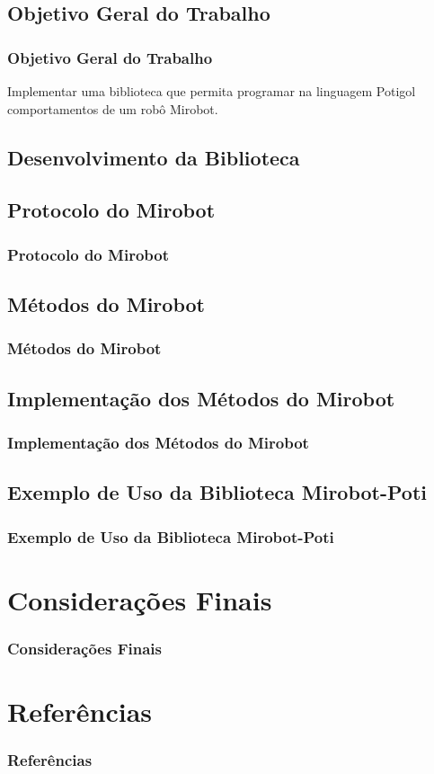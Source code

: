 \documentclass{beamer}
\begin{document}
\begin{frame}
  \section{Objetivo Geral do Trabalho}
  \frametitle{Objetivo Geral do Trabalho}
  \begin{center}
    Implementar uma biblioteca que permita programar na linguagem Potigol comportamentos de um robô Mirobot.
  \end{center}
\end{frame}
\begin{frame}
  \section{Desenvolvimento da Biblioteca}
  \subsection{Protocolo do Mirobot}
  \label{protocolo}
  \frametitle{Protocolo do Mirobot}
\end{frame}

\begin{frame}
  \subsection{Métodos do Mirobot}
  \label{metodos}
  \frametitle{Métodos do Mirobot}
\end{frame}

\begin{frame}
  \subsection{Implementação dos Métodos do Mirobot}
  \label{implementacao}
  \frametitle{Implementação dos Métodos do Mirobot}
\end{frame}

\begin{frame}
  \subsection{Exemplo de Uso da Biblioteca Mirobot-Poti}
  \label{exemplo}
  \frametitle{Exemplo de Uso da Biblioteca Mirobot-Poti}
\end{frame}

\begin{frame}
  \label{consideracoes}
  \section{Considerações Finais}
  \frametitle{Considerações Finais}
\end{frame}

\begin{frame}
  \label{referencias}
  \section{Referências}
  \frametitle{Referências}
%
% 

  
\end{frame}
\end{document}
